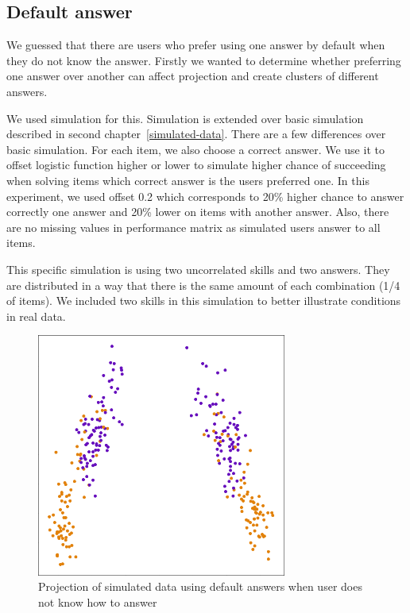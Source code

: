 \documentclass[
  printed, %
  table,   %
  nolof,     %
  nolot,     %
  color,
  final,
  nocover
]{fithesis3}
\begin{document}

\subsection{Default answer}\label{default-answer}

We guessed that there are users who prefer using one answer by default when they do not know the answer. Firstly we wanted to determine whether preferring one answer over another can affect projection and create clusters of different answers.

We used simulation for this. Simulation is extended over basic simulation described in second chapter~\ref{simulated-data}. There are a few differences over basic simulation. For each item, we also choose a correct answer. We use it to offset logistic function higher or lower to simulate higher chance of succeeding when solving items which correct answer is the users preferred one. In this experiment, we used offset 0.2 which corresponds to 20\% higher chance to answer correctly one answer and 20\% lower on items with another answer. Also, there are no missing values in performance matrix as simulated users answer to all items.

This specific simulation is using two uncorrelated skills and two answers. They are distributed in a way that there is the same amount of each combination (1/4 of items). We included two skills in this simulation to better illustrate conditions in real data.

\begin{figure}
  \includegraphics[height=8cm]{img/simulated_default}
  \caption{Projection of simulated data using default answers when user does not know how to answer}
  \label{fig:simulated_default}
\end{figure}
\end{document}
